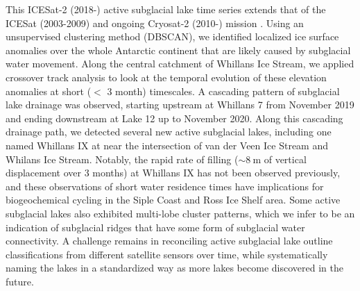 This ICESat-2 (2018-) active subglacial lake time series extends that of the ICESat (2003-2009) and ongoing Cryosat-2 (2010-) mission \citep{SiegfriedThirteenyearssubglacial2018}.
Using an unsupervised clustering method (\gls{DBSCAN}), we identified localized ice surface anomalies over the whole Antarctic continent that are likely caused by subglacial water movement.
Along the central catchment of Whillans Ice Stream, we applied crossover track analysis to look at the temporal evolution of these elevation anomalies at short ($<$ 3 month) timescales.
A cascading pattern of subglacial lake drainage was observed, starting upstream at Whillans 7 from November 2019 and ending downstream at Lake 12 up to November 2020.
Along this cascading drainage path, we detected several new active subglacial lakes, including one named Whillans IX at near the intersection of van der Veen Ice Stream and Whilans Ice Stream.
Notably, the rapid rate of filling ($\sim\SI{8}{\metre}$ of vertical displacement over 3 months) at Whillans IX has not been observed previously, and these observations of short water residence times have implications for biogeochemical cycling in the Siple Coast and Ross Ice Shelf area.
Some active subglacial lakes also exhibited multi-lobe cluster patterns, which we infer to be an indication of subglacial ridges that have some form of subglacial water connectivity.
A challenge remains in reconciling active subglacial lake outline classifications from different satellite sensors over time, while systematically naming the lakes in a standardized way as more lakes become discovered in the future.
